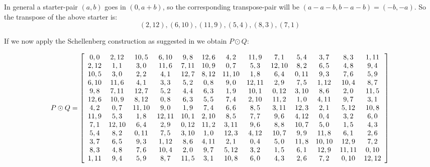 \documentclass[11pt, a4paper]{book}\usepackage[]{graphicx}\usepackage[]{xcolor}
\begin{document}
In general a starter-pair $(a, b)$ goes in $(0, a  +b)$,
so the corresponding transpose-pair will be
$(a - a - b, b - a - b) = (-b, -a)$. So the transpose of
the above starter is:
$$(2, 12), (6, 10), (11, 9), (5, 4), (8, 3), (7, 1)$$

If we now apply the Schellenberg construction as suggested
in
\cite{hwangCompleteBalancedHowell1984}
we obtain $P \odot Q$:

\begin{equation}
  P \odot Q = \left[\begin{array}{*{13}c}
   0,0  & 2,12  & 10,5  & 6,10  & 9,8  & 12,6 &  4,2  & 11,9  &  7,1  & 5,4  &  3,7  &  8,3  & 1,11 \\
   2,12 &  1,1  &  3,0  & 11,6  & 7,11 & 10,9 &  0,7  &  5,3  & 12,10 & 8,2  &  6,5  &  4,8  &  9,4 \\
   10,5 &  3,0  &  2,2  &  4,1  & 12,7 & 8,12 & 11,10 &  1,8  &  6,4  & 0,11 &  9,3  &  7,6  &  5,9 \\
   6,10 & 11,6  &  4,1  &  3,3  & 5,2  & 0,8  &  9,0  & 12,11 &  2,9  & 7,5  & 1,12  & 10,4  &  8,7 \\
   9,8  & 7,11  & 12,7  &  5,2  & 4,4  & 6,3  &  1,9  & 10,1  & 0,12  & 3,10 &  8,6  &  2,0  & 11,5 \\
   12,6 & 10,9  & 8,12  &  0,8  & 6,3  & 5,5  &  7,4  & 2,10  & 11,2  & 1,0  & 4,11  &  9,7  &  3,1 \\
   4,2  &  0,7  & 11,10 &  9,0  & 1,9  & 7,4  &  6,6  &  8,5  & 3,11  & 12,3 &  2,1  & 5,12  & 10,8 \\
   11,9 &  5,3  &  1,8  & 12,11 & 10,1 & 2,10 &  8,5  &  7,7  &  9,6  & 4,12 &  0,4  &  3,2  &  6,0 \\
   7,1  & 12,10 &  6,4  &  2,9  & 0,12 & 11,2 & 3,11  &  9,6  &  8,8  & 10,7 &  5,0  &  1,5  &  4,3 \\
   5,4  &  8,2  & 0,11  &  7,5  & 3,10 & 1,0  & 12,3  & 4,12  & 10,7  & 9,9  & 11,8  &  6,1  &  2,6 \\
   3,7  &  6,5  &  9,3  & 1,12  & 8,6  & 4,11 &  2,1  &  0,4  &  5,0  & 11,8 & 10,10 & 12,9  &  7,2 \\
   8,3  &  4,8  &  7,6  & 10,4  & 2,0  & 9,7  & 5,12  &  3,2  &  1,5  & 6,1  & 12,9  & 11,11 & 0,10 \\
   1,11 &  9,4  &  5,9  &  8,7  & 11,5 & 3,1  & 10,8  &  6,0  &  4,3  & 2,6  &  7,2  & 0,10  & 12,12 \\
  \end{array}\right]
\end{equation}
\end{document}
